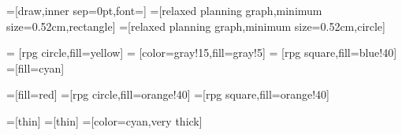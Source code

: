 


\subtitle{}
\date{April 29, 2020}


\usetikzlibrary{shapes}

=[draw,inner sep=0pt,font=\small]
=[relaxed planning graph,minimum size=0.52cm,rectangle]
=[relaxed planning graph,minimum size=0.52cm,circle]

=        [rpg circle,fill=yellow]
=    [color=gray!15,fill=gray!5]
=    [rpg square,fill=blue!40]
=[fill=cyan]

=[fill=red]
=[rpg circle,fill=orange!40]
=[rpg square,fill=orange!40]

=[thin]
=[thin]
=[color=cyan,very thick]

\newcommand{\markplusone}[1]{\path (#1) +(-0.04cm,0.28cm) node {\tiny $+1$};}
\newcommand{\markopnode}[3][0.35cm]{\path (#2) +(0cm,#1) node {\tiny
    \ensuremath{#3}};}
\newcommand{\markopnodeff}[3][0.30cm]{\path (#2) +(0cm,#1) node {\tiny
    \ensuremath{#3}};}
\newcommand{\markopcost}[2]{\path (#1) +(0.45cm,0.15cm) node {\tiny $+#2$};}

\newcommand{\pre}{\ensuremath{\textit{pre}}}
\newcommand{\add}{\ensuremath{\textit{add}}}
\newcommand{\del}{\ensuremath{\textit{del}}}
\newcommand{\relaxation}[1]{\ensuremath{#1^+}}
\newcommand{\hplus}{\ensuremath{h^+}}
\newcommand{\hmax}{\ensuremath{h^{\textup{max}}}}
\newcommand{\hadd}{\ensuremath{h^{\textup{add}}}}
\newcommand{\hff}{\ensuremath{h^{\textup{FF}}}}


